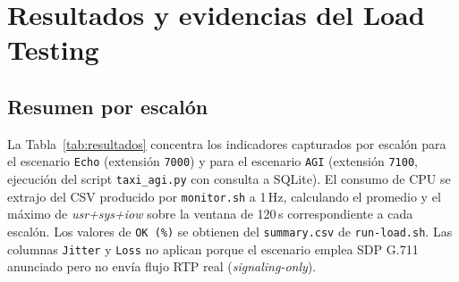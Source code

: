 \documentclass[conference]{IEEEtran}
\begin{document}
\section{Resultados y evidencias del Load Testing}
\label{sec:resultados}

\subsection{Resumen por escal\'on}

La Tabla~\ref{tab:resultados} concentra los indicadores capturados por
escal\'on para el escenario \texttt{Echo} (extensi\'on \texttt{7000}) y
para el escenario \texttt{AGI} (extensi\'on \texttt{7100}, ejecuci\'on
del script \texttt{taxi\_agi.py} con consulta a SQLite). El consumo de
CPU se extrajo del CSV producido por \texttt{monitor.sh} a 1\,Hz,
calculando el promedio y el m\'aximo de \textit{usr+sys+iow} sobre la
ventana de 120\,s correspondiente a cada escal\'on. Los valores de
\texttt{OK\,(\%)} se obtienen del \texttt{summary.csv} de
\texttt{run-load.sh}. Las columnas \texttt{Jitter} y \texttt{Loss} no
aplican porque el escenario emplea SDP G.711 anunciado pero no env\'ia
flujo RTP real (\textit{signaling-only}).

\begin{table}[!t]
\caption{Resultados del Load Test ejecutado sobre la VM AGI--TAXI (Asterisk 20.19, Debian Trixie). Ambos escenarios completaron las 17\,400 llamadas con tasa de \'exito del 100\,\% y cero retransmisiones. CPU avg/max sobre la ventana activa de cada escal\'on, escenario AGI.}
\label{tab:resultados}
\renewcommand{\arraystretch}{1.2}
\setlength{\tabcolsep}{3pt}
\begin{center}
\end{center}
\end{table}
\end{document}
